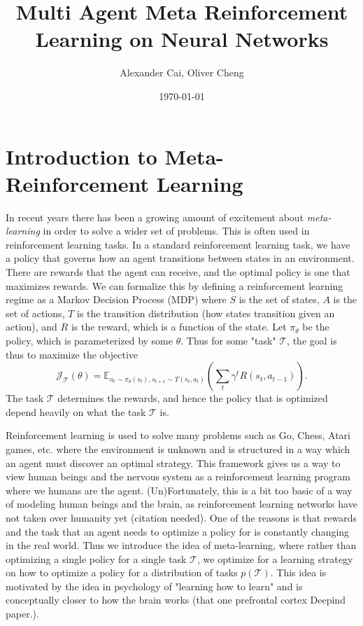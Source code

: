 \documentclass[11pt,letterpaper]{article}
\author{Alexander Cai, Oliver Cheng}
\date{\today}
\title{Multi Agent Meta Reinforcement Learning on Neural Networks}
\begin{document}
\maketitle
\section{Introduction to Meta-Reinforcement Learning}
In recent years there has been a growing amount of excitement about 
\textit{meta-learning} in order to solve a wider set of problems. This is 
often used in reinforcement learning tasks. In a standard reinforcement
 learning task, we have a policy that governs how an agent transitions 
between states in an environment. There are rewards that the agent can 
receive, and the optimal policy is one that maximizes rewards. We can 
formalize this by defining a reinforcement learning regime as a Markov 
Decision Process (MDP) where $S$ is the set of states, $A$ is the set 
of actions, $T$ is the transition distribution (how states transition given 
an action), and $R$ is the reward, which is a function of the state. Let 
$\pi_\theta$ be the policy, which is parameterized by some $\theta$. 
Thus for some "task" $\mathcal{T}$, the goal is thus to maximize the objective 
\[ \mathcal{J}_{\mathcal{T}}(\theta) = \mathbb{E}_{a_t \sim \pi_\theta(s_t), s_{t+1}
 \sim T(s_t, a_t)} \left( \sum_t \gamma^t R(s_t, a_{t-1}) \right).\]
The task $\mathcal{T}$ determines the rewards, and hence the policy that is optimized 
depend heavily on what the task $\mathcal{T}$ is. 

Reinforcement learning is used to solve many problems such as Go, Chess, 
Atari games, etc. where the environment is unknown and is structured in 
a way which an agent must discover an optimal strategy. This framework 
gives us a way to view human beings and the nervous system as a 
reinforcement learning program where we humans are the agent. 
(Un)Fortunately, this is a bit too basic of a way of modeling human 
beings and the brain, as reinforcement learning networks have not taken 
over humanity yet (citation needed). One of the reasons is that rewards 
and the task that an agent needs to optimize a policy for is constantly 
changing in the real world. Thus we introduce the idea of meta-learning, 
where rather than optimizing a single policy for a single task $\mathcal{T}$, 
we optimize for a learning strategy on how to optimize a policy for a distribution 
of tasks $p(\mathcal{T})$. This idea is motivated by the idea in psychology of
 "learning how to learn" and is conceptually closer to how the brain 
works (that one prefrontal cortex Deepind paper.). 
\end{document}
